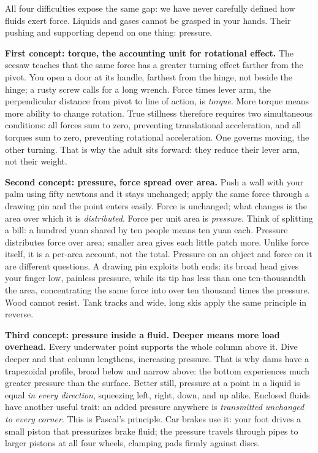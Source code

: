 All four difficulties expose the same gap: we have never carefully defined how fluids exert force. Liquids and gases cannot be grasped in your hands. Their pushing and supporting depend on one thing: pressure.


\begin{mainline}
\textbf{First concept: torque, the accounting unit for rotational effect.} The seesaw teaches that the same force has a greater turning effect farther from the pivot. You open a door at its handle, farthest from the hinge, not beside the hinge; a rusty screw calls for a long wrench. Force times lever arm, the perpendicular distance from pivot to line of action, is \emph{torque}. More torque means more ability to change rotation. True stillness therefore requires two simultaneous conditions: all forces sum to zero, preventing translational acceleration, and all torques sum to zero, preventing rotational acceleration. One governs moving, the other turning. That is why the adult sits forward: they reduce their lever arm, not their weight.

\textbf{Second concept: pressure, force spread over area.} Push a wall with your palm using fifty newtons and it stays unchanged; apply the same force through a drawing pin and the point enters easily. Force is unchanged; what changes is the area over which it is \emph{distributed}. Force per unit area is \emph{pressure}. Think of splitting a bill: a hundred yuan shared by ten people means ten yuan each. Pressure distributes force over area; smaller area gives each little patch more. Unlike force itself, it is a per-area account, not the total. Pressure on an object and force on it are different questions. A drawing pin exploits both ends: its broad head gives your finger low, painless pressure, while its tip has less than one ten-thousandth the area, concentrating the same force into over ten thousand times the pressure. Wood cannot resist. Tank tracks and wide, long skis apply the same principle in reverse.

\textbf{Third concept: pressure inside a fluid. Deeper means more load overhead.} Every underwater point supports the whole column above it. Dive deeper and that column lengthens, increasing pressure. That is why dams have a trapezoidal profile, broad below and narrow above: the bottom experiences much greater pressure than the surface. Better still, pressure at a point in a liquid is equal \emph{in every direction}, squeezing left, right, down, and up alike. Enclosed fluids have another useful trait: an added pressure anywhere is \emph{transmitted unchanged to every corner}. This is Pascal's principle. Car brakes use it: your foot drives a small piston that pressurizes brake fluid; the pressure travels through pipes to larger pistons at all four wheels, clamping pads firmly against discs.


\end{mainline}
